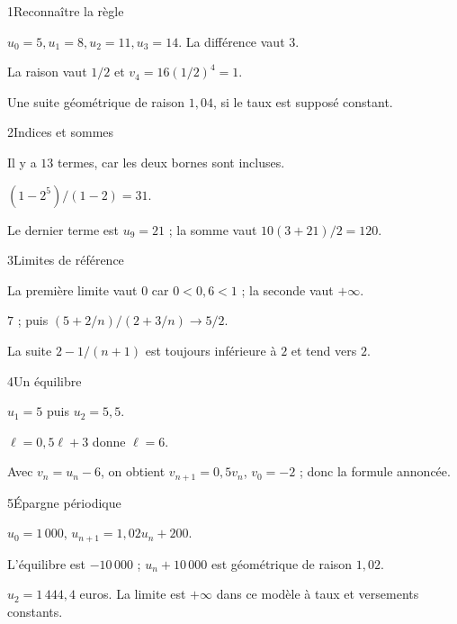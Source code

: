 \begin{corrige}{1}{Reconnaître la règle}
\begin{questions}
\item $u_0=5,u_1=8,u_2=11,u_3=14$. La différence vaut $3$.
\item La raison vaut $1/2$ et $v_4=16(1/2)^4=1$.
\item Une suite géométrique de raison $1{,}04$, si le taux est supposé constant.
\end{questions}
\end{corrige}
\begin{corrige}{2}{Indices et sommes}
\begin{questions}
\item Il y a $13$ termes, car les deux bornes sont incluses.
\item $(1-2^5)/(1-2)=31$.
\item Le dernier terme est $u_9=21$ ; la somme vaut $10(3+21)/2=120$.
\end{questions}
\end{corrige}
\begin{corrige}{3}{Limites de référence}
\begin{questions}
\item La première limite vaut $0$ car $0<0{,}6<1$ ; la seconde vaut $+\infty$.
\item $7$ ; puis $(5+2/n)/(2+3/n)\to5/2$.
\item La suite $2-1/(n+1)$ est toujours inférieure à $2$ et tend vers $2$.
\end{questions}
\end{corrige}
\begin{corrige}{4}{Un équilibre}
\begin{questions}
\item $u_1=5$ puis $u_2=5{,}5$.
\item $\ell=0{,}5\ell+3$ donne $\ell=6$.
\item Avec $v_n=u_n-6$, on obtient $v_{n+1}=0{,}5v_n$, $v_0=-2$ ; donc la formule annoncée.
\end{questions}
\end{corrige}
\begin{corrige}{5}{Épargne périodique}
\begin{questions}
\item $u_0=1\,000$, $u_{n+1}=1{,}02u_n+200$.
\item L’équilibre est $-10\,000$ ; $u_n+10\,000$ est géométrique de raison $1{,}02$.
\item $u_2=1\,444{,}4$ euros. La limite est $+\infty$ dans ce modèle à taux et versements constants.
\end{questions}
\end{corrige}
